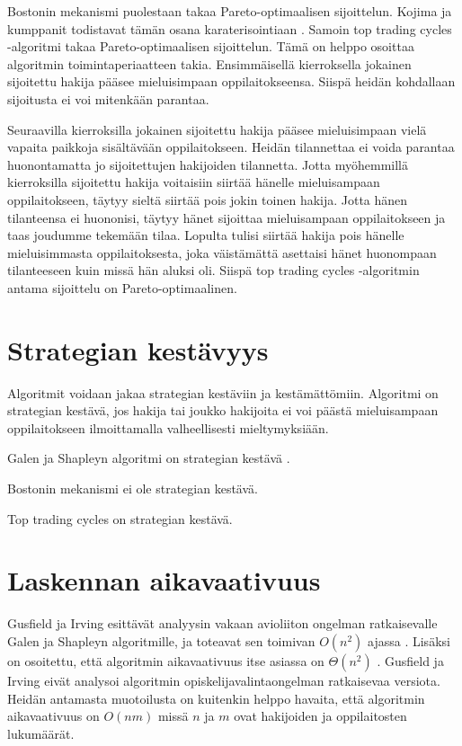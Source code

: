 \documentclass[gradu, twoside]{tktltiki}
\begin{document}
Bostonin mekanismi puolestaan takaa Pareto-optimaalisen sijoittelun.
Kojima ja kumppanit todistavat tämän osana karaterisointiaan
\cite{kojima10}. Samoin top trading cycles -algoritmi takaa
Pareto-optimaalisen sijoittelun. Tämä on helppo osoittaa algoritmin
toimintaperiaatteen takia. Ensimmäisellä kierroksella jokainen
sijoitettu hakija pääsee mieluisimpaan oppilaitokseensa. Siispä heidän
kohdallaan sijoitusta ei voi mitenkään parantaa.

Seuraavilla kierroksilla jokainen sijoitettu hakija pääsee
mieluisimpaan vielä vapaita paikkoja sisältävään oppilaitokseen.
Heidän tilannettaa ei voida parantaa huonontamatta jo sijoitettujen
hakijoiden tilannetta. Jotta myöhemmillä kierroksilla sijoitettu
hakija voitaisiin siirtää hänelle mieluisampaan oppilaitokseen, täytyy
sieltä siirtää pois jokin toinen hakija. Jotta hänen tilanteensa ei
huononisi, täytyy hänet sijoittaa mieluisampaan oppilaitokseen ja taas
joudumme tekemään tilaa. Lopulta tulisi siirtää hakija pois hänelle
mieluisimmasta oppilaitoksesta, joka väistämättä asettaisi hänet
huonompaan tilanteeseen kuin missä hän aluksi oli. Siispä top trading
cycles -algoritmin antama sijoittelu on Pareto-optimaalinen.

\section{Strategian kestävyys}

Algoritmit voidaan jakaa strategian kestäviin ja kestämättömiin.
Algoritmi on strategian kestävä, jos hakija tai joukko hakijoita ei
voi päästä mieluisampaan oppilaitokseen ilmoittamalla valheellisesti
mieltymyksiään.

Galen ja Shapleyn algoritmi on strategian kestävä \cite{dubins81}.

Bostonin mekanismi ei ole strategian kestävä.

Top trading cycles on strategian kestävä.

\section{Laskennan aikavaativuus}

Gusfield ja Irving esittävät analyysin vakaan avioliiton ongelman
ratkaisevalle Galen ja Shapleyn algoritmille, ja toteavat sen toimivan
$O(n^2)$ ajassa \cite{gusfield89}. Lisäksi on osoitettu, että
algoritmin aikavaativuus itse asiassa on $\Theta(n^2)$ \cite{cheng89}.
Gusfield ja Irving eivät analysoi algoritmin opiskelijavalintaongelman
ratkaisevaa versiota. Heidän antamasta muotoilusta on kuitenkin helppo
havaita, että algoritmin aikavaativuus on $O(nm)$ missä $n$ ja $m$
ovat hakijoiden ja oppilaitosten lukumäärät.
\end{document}
